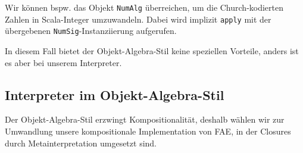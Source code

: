 \documentclass[]{article}
\begin{document}
Wir können bspw. das Objekt \texttt{NumAlg} überreichen, um die
Church-kodierten Zahlen in Scala-Integer umzuwandeln. Dabei wird
implizit \texttt{apply} mit der übergebenen
\texttt{NumSig}-Instanziierung aufgerufen.

In diesem Fall bietet der Objekt-Algebra-Stil keine speziellen Vorteile,
anders ist es aber bei unserem Interpreter.

\hypertarget{interpreter-im-objekt-algebra-stil}{%
\subsection{Interpreter im
Objekt-Algebra-Stil}\label{interpreter-im-objekt-algebra-stil}}

Der Objekt-Algebra-Stil erzwingt Kompositionalität, deshalb wählen wir
zur Umwandlung unsere kompositionale Implementation von FAE, in der
Closures durch Metainterpretation umgesetzt sind.
\end{document}
